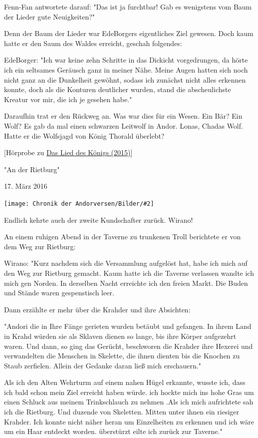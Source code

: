 \documentclass[10pt, a4paper, oneside]{book}
\newcommand{\refprodukt}[1]{\hyperref[Produkt: #1]{#1}}
\newcommand{\bildmitts}[2][height=0.32\textwidth,width=0.48\textwidth,keepaspectratio]{%
    \begin{center}
        \texttt{[image: Chronik der Andorversen/Bilder/\#2]}
    \end{center}
}
\begin{document}
\begin{multicols}{2}
Fenn-Fan antwortete darauf: "Das ist ja furchtbar! Gab es wenigstens vom Baum der Lieder gute Neuigkeiten?"

Denn der Baum der Lieder war EdeBorgers eigentliches Ziel gewesen. Doch kaum hatte er den Saum des Waldes erreicht, geschah folgendes:

EdeBorger: "Ich war keine zehn Schritte in das Dickicht vorgedrungen, da hörte ich ein seltsames Geräusch ganz in meiner Nähe. Meine Augen hatten sich noch nicht ganz an die Dunkelheit gewöhnt, sodass ich zunächst nicht alles erkennen konnte, doch als die Konturen deutlicher wurden, stand die abscheulichste Kreatur vor mir, die ich je gesehen habe."

Daraufhin trat er den Rückweg an. Was war dies für ein Wesen. Ein Bär? Ein Wolf? Es gab da mal einen schwarzen Leitwolf in Andor. Lonas, Chadas Wolf. Hatte er die Wolfsjagd von König Thorald überlebt?

[Hörprobe zu \refprodukt{Das Lied des Königs (2015)}]


\begin{center}
    "An der Rietburg"

    17. März 2016
\end{center}


\bildmitts{AA2016 Blog 3.jpeg}


Endlich kehrte auch der zweite Kundschafter zurück. Wirano!

An einem ruhigen Abend in der Taverne zu trunkenen Troll berichtete er von dem Weg zur Rietburg:

Wirano: "Kurz nachdem sich die Versammlung aufgelöst hat, habe ich mich auf den Weg zur Rietburg gemacht. Kaum hatte ich die Taverne verlassen wandte ich mich gen Norden. In derselben Nacht erreichte ich den freien Markt. Die Buden und Stände waren
gespenstisch leer.

Dann erzählte er mehr über die Krahder und ihre Absichten:

"Andori die in Ihre Fänge gerieten wurden betäubt und gefangen. In ihrem Land in Krahd würden sie als Sklaven dienen so lange, bis ihre Körper aufgezehrt waren. Und dann, so ging das Gerücht, beschworen die Krahder ihre Hexerei und verwandelten die Menschen in Skelette, die ihnen dienten bis die Knochen zu Staub zerfielen. Allein der Gedanke daran ließ mich erschauern."

Als ich den Alten Wehrturm auf einem nahen Hügel erkannte, wusste ich, dass ich bald schon mein Ziel erreicht haben würde. ich hockte mich ins hohe Gras um einen Schluck aus meinem Trinkschlauch zu nehmen .Als ich mich aufrichtete sah ich die Rietburg. Und duzende von Skeletten. Mitten unter ihnen ein riesiger Krahder. Ich konnte nicht näher heran um Einzelheiten zu erkennen und ich wäre um ein Haar entdeckt worden. überstürzt eilte ich zurück zur Taverne."


\end{multicols}
\end{document}
